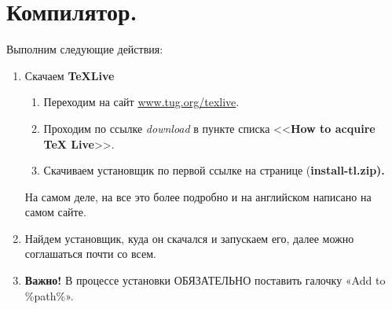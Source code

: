 \section{Компилятор.}
Выполним следующие действия:
\begin{enumerate}
\item Скачаем {\bf \TeX{}Live}
  \begin{enumerate}
    \item Переходим на сайт \url{www.tug.org/texlive}.
    \item Проходим по ссылке {\it download} в пункте списка
      <<{\bf How to acquire TeX Live}>>.
    \item Скачиваем установщик по первой ссылке на странице
      (\bfseries{install-tl.zip}).
  \end{enumerate}
  На самом деле, на все это более подробно и на английском написано на
  самом сайте.
\item Найдем установщик, куда он скачался и запускаем его, далее можно соглашаться почти со всем.
\item {\bf Важно!} В процессе установки ОБЯЗАТЕЛЬНО поставить галочку «Add to \%path\%».
\end{enumerate}
